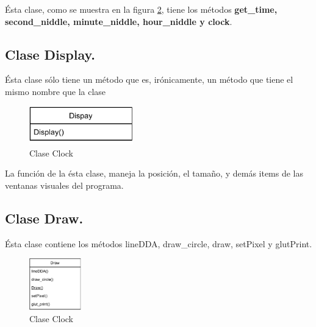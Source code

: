 Ésta clase, como se muestra en la figura \ref{fig:clock}, tiene los métodos \textbf{get\_time, second\_niddle, minute\_niddle, hour\_niddle y clock}.

\subsection{Clase Display.} \label{subsec:display}
Ésta clase sólo tiene un método que es, irónicamente, un método que tiene el mismo nombre que la clase

\begin{figure}[H]
	\centering
	\includegraphics[width=0.4\textwidth]{../img/chapter02/5.pdf}
	\caption{Clase Clock}
	\label{fig:clock}
\end{figure}

La función de la ésta clase, maneja la posición, el tamaño, y demás items de las ventanas visuales del programa.

\subsection{Clase Draw.} \label{subsec:draw}

Ésta clase contiene los métodos lineDDA, draw\_circle, draw, setPixel y glutPrint.

\begin{figure}[H]
	\centering
	\includegraphics[width=0.2\textwidth]{../img/chapter02/6.pdf}
	\caption{Clase Clock}
	\label{fig:clock}
\end{figure}





